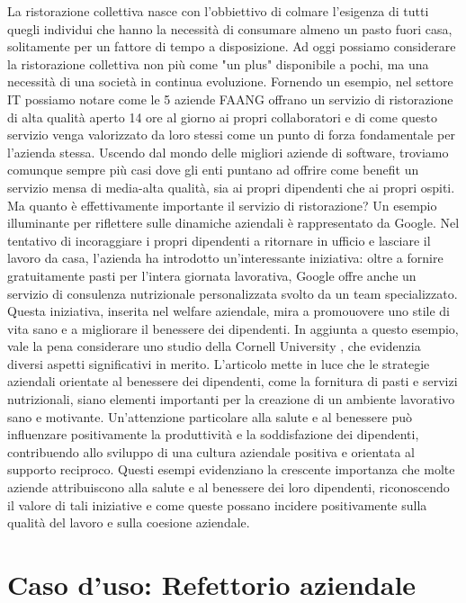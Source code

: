 \documentclass[a4paper, titlepage, 12pt, openright, twoside]{book}
\begin{document}
La ristorazione collettiva nasce con l'obbiettivo di colmare l'esigenza di tutti quegli individui
che hanno la necessità di consumare almeno un pasto fuori casa, solitamente per un fattore di tempo a disposizione.
Ad oggi possiamo considerare la ristorazione collettiva non più come "un plus" disponibile a pochi, ma una necessità di una società in continua evoluzione.
Fornendo un esempio, nel settore IT possiamo notare come le 5 aziende FAANG offrano un servizio di ristorazione di alta qualità aperto 14 ore al giorno ai propri collaboratori
e di come questo servizio venga valorizzato da loro stessi come un punto di forza fondamentale per l'azienda stessa.
\newline
Uscendo dal mondo delle migliori aziende di software, troviamo comunque sempre più casi dove gli enti puntano ad offrire come benefit un servizio mensa di media-alta qualità,
sia ai propri dipendenti che ai propri ospiti.
\newline
Ma quanto è effettivamente importante il servizio di ristorazione?
\newline
Un esempio illuminante per riflettere sulle dinamiche aziendali è rappresentato da Google. Nel tentativo di incoraggiare i propri dipendenti a ritornare in ufficio e lasciare il lavoro da casa, l'azienda ha introdotto un'interessante iniziativa: oltre a fornire gratuitamente pasti per l'intera giornata lavorativa, Google offre anche un servizio di consulenza nutrizionale personalizzata svolto da un team specializzato. Questa iniziativa, inserita nel welfare aziendale, mira a promouovere uno stile di vita sano e a migliorare il benessere dei dipendenti.
In aggiunta a questo esempio, vale la pena considerare uno studio della Cornell University \cite{cornell}, che evidenzia diversi aspetti significativi in merito. L'articolo mette in luce che le strategie aziendali orientate al benessere dei dipendenti, come la fornitura di pasti e servizi nutrizionali, siano elementi importanti per la creazione di un ambiente lavorativo sano e motivante. Un'attenzione particolare alla salute e al benessere può influenzare positivamente la produttività e la soddisfazione dei dipendenti, contribuendo allo sviluppo di una cultura aziendale positiva e orientata al supporto reciproco. Questi esempi evidenziano la crescente importanza che molte aziende attribuiscono alla salute e al benessere dei loro dipendenti, riconoscendo il valore di tali iniziative e come queste possano incidere positivamente sulla qualità del lavoro e sulla coesione aziendale.

\chapter{Caso d'uso: Refettorio aziendale}\label{chap:caso}
\end{document}
